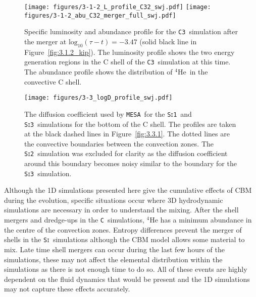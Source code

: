 \documentclass[useAMS,usenatbib]{mn2e}
\newcommand{\mesa}{\texttt{MESA}}
\newcommand{\Cc}{\textsc{\texttt{C3}}}
\newcommand{\Sia}{\textsc{\texttt{Si1}}}
\newcommand{\Sib}{\textsc{\texttt{Si2}}}
\newcommand{\Sic}{\textsc{\texttt{Si3}}}
\newcommand{\C}{\textsc{\texttt{C}}}
\newcommand{\Si}{\textsc{\texttt{Si}}}
\newcommand{\nuclei}[2]{\ensuremath{\mathrm{^{#1}#2}}}
\newcommand{\helium}[1][4]{\nuclei{#1}{He}}
\begin{document}
\begin{figure}
	\texttt{[image: figures/3-1-2\_L\_profile\_C32\_swj.pdf]}
	\texttt{[image: figures/3-1-2\_abu\_C32\_merger\_full\_swj.pdf]}%
	\caption{
		Specific luminosity and abundance profile for the \Cc\ simulation 
		after the merger at $\mathrm{log}_{10}(\tau - t) = -3.47$ (solid 
		black line in Figure~\ref{fig:3.1.2_kip}). The luminosity profile 
		shows the two energy generation regions in the C shell of the 
		\Cc~simulation at this time. The abundance profile shows the 
		distribution of \helium\ in the convective C shell.
	}
	\label{fig:3.1.2_L_abu} %
\end{figure}

\begin{figure}
	\texttt{[image: figures/3-3\_logD\_profile\_swj.pdf]}
	\caption{
		The diffusion coefficient used by \mesa~for the \Sia\ and \Sic\ 
		simulations for the bottom of the C shell. The profiles are taken 
		at the black dashed lines in Figure~\ref{fig:3.3.1}. The dotted 
		lines are the convective boundaries between the convection zones. 
		The \Sib\ simulation was excluded for clarity as the diffusion 
		coefficient around this boundary becomes noisy similar to the 
		boundary for the \Sic\ simulation.
	}
	\label{fig:3.3.1_logD} %
\end{figure}

Although the 1D simulations presented here give the cumulative effects of CBM
during the evolution, specific situations occur where 3D hydrodynamic
simulations are necessary in order to understand the mixing. After the shell
mergers and dredge-ups in the \C\ simulations, $\helium$ has a minimum
abundance in the centre of the convection zones. Entropy differences prevent
the merger of shells in the \Si\ simulations although the CBM model allows
some material to mix. Late time shell mergers can occur during the last few
hours of the simulations, these may not affect the elemental distribution
within the simulations as there is not enough time to do so. All of these
events are highly dependent on the fluid dynamics that would be present 
and the 1D simulations may not capture these effects accurately.  
\end{document}
